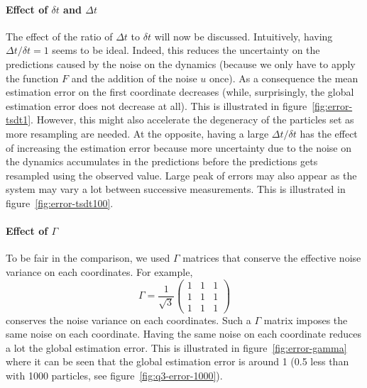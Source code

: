 \documentclass[english, DIV=13]{scrartcl}
\begin{document}
\paragraph{Effect of $\delta t$ and $\Delta t$}
The effect of the ratio of $\Delta t$ to $\delta t$ will now be discussed. Intuitively,
having $\Delta t/\delta t = 1$ seems to be ideal. Indeed, this reduces the uncertainty
on the predictions caused by the noise on the dynamics (because we only have to apply
the function $F$ and the addition of the noise $u$ once). As a consequence the mean
estimation error on the first coordinate decreases (while, surprisingly, the global
estimation error does not decrease at all). This is illustrated in figure~\ref{fig:error-tsdt1}.
However, this might also accelerate the degeneracy of the particles set as more
resampling are needed. At the opposite, having a large $\Delta t/\delta t$ has the
effect of increasing the estimation error because more uncertainty due to the noise on
the dynamics accumulates in the predictions before the predictions gets resampled using
the observed value. Large peak of errors may also appear as the system may vary a lot between
successive measurements. This is illustrated in figure~\ref{fig:error-tsdt100}.

\paragraph{Effect of $\Gamma$}
To be fair in the comparison, we used $\Gamma$ matrices that conserve the effective
noise variance on each coordinates. For example,
\begin{equation*}
    \Gamma = \frac{1}{\sqrt{3}}
    \begin{pmatrix}
        1 & 1 & 1 \\
        1 & 1 & 1 \\
        1 & 1 & 1
    \end{pmatrix}
\end{equation*}
conserves the noise variance on each coordinates. Such a $\Gamma$ matrix imposes the
same noise on each coordinate. Having the same noise on each coordinate reduces a lot
the global estimation error. This is illustrated in figure~\ref{fig:error-gamma} where it
can be seen that the global estimation error is around 1 (0.5 less than with 1000 particles,
see figure~\ref{fig:q3-error-1000}).
\end{document}
